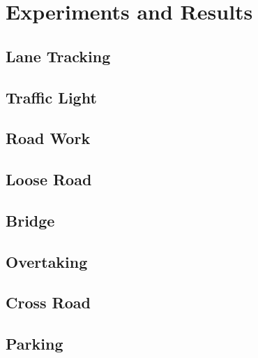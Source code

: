 \chapter{Experiments and Results}
\label{chp:b6}

\section{Lane Tracking}
\section{Traffic Light}
\section{Road Work}
\section{Loose Road}
\section{Bridge}
\section{Overtaking}
\section{Cross Road}
\section{Parking}
